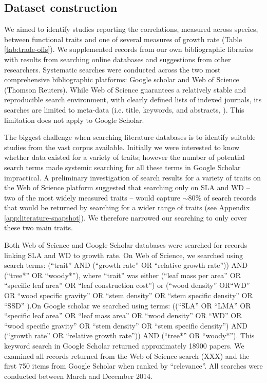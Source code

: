 \documentclass[a4paper,11pt]{article}
\begin{document}
\subsection*{Dataset construction}\label{data-construction}

We aimed to identify studies reporting the correlations, measured across species, between functional traits and one of several measures of growth rate (Table \ref{tab:trade-offs}). We supplemented records from our own bibliographic libraries with results from searching online databases and suggestions from other researchers. Systematic searches were conducted across the two most comprehensive bibliographic platforms: Google scholar and Web of Science (Thomson Reuters). While Web of Science guarantees a relatively stable and reproducible search environment, with clearly defined lists of indexed journals, its searches are limited to meta-data (i.e. title, keywords, and abstracts, \citealt{Beckmann:2012hn}). This limitation does not apply to Google Scholar.

The biggest challenge when searching literature databases is to identify suitable studies from the vast corpus available. Initially we were interested to know whether data existed for a variety of traits; however the number of potential search terms made systemic searching for all these terms in Google Scholar impractical. A preliminary investigation of search results for a variety of traits on the Web of Science platform suggested that searching only on SLA and WD -- two of the most widely measured traits -- would capture  $\sim$80\% of search records that would be returned by searching for a wider range of traits (see Appendix \ref{app:literature-snapshot}). We therefore narrowed our searching to only cover these two main traits.

Both Web of Science and Google Scholar databases were searched for records linking SLA and WD to growth rate. On Web of Science, we searched using  search terms: (``trait'' AND (``growth rate'' OR ``relative growth rate'')) AND (``tree*'' OR ``woody*''), where ``trait'' was either (``leaf mass per area'' OR ``specific leaf area'' OR ``leaf construction cost'') or (``wood density'' OR``WD'' OR ``wood specific gravity'' OR ``stem density'' OR ``stem specific density'' OR ``SSD'' ).On Google scholar we searched using terms: ((``SLA'' OR ``LMA'' OR ``specific leaf area'' OR ``leaf mass area'' OR ``wood density'' OR ``WD'' OR ``wood specific gravity'' OR ``stem density'' OR ``stem specific density'') AND (``growth rate'' OR ``relative growth rate'')) AND (``tree*'' OR ``woody*''). This keyword search in Google Scholar returned approximately 18900 papers. We examined all records returned from the Web of Science search (XXX) and the first 750 items from Google Scholar when ranked by ``relevance''. All searches were conducted between March and December 2014.
\end{document}
